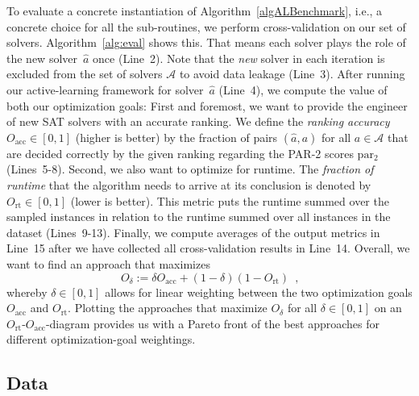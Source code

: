 \documentclass[runningheads]{llncs}
\begin{document}
To evaluate a concrete instantiation of Algorithm~\ref{algALBenchmark}, i.e., a concrete choice for all the sub-routines, we perform cross-validation on our set of solvers.
Algorithm~\ref{alg:eval} shows this.
That means each solver plays the role of the new solver~$\hat{a}$ once (Line~2).
Note that the \emph{new} solver in each iteration is excluded from the set of solvers $\mathcal{A}$ to avoid data leakage (Line~3).
After running our active-learning framework for solver~$\hat{a}$ (Line~4), we compute the value of both our optimization goals:
First and foremost, we want to provide the engineer of new SAT solvers with an accurate ranking.
We define the \emph{ranking accuracy} $O_{\operatorname{acc}} \in \left[0, 1\right]$ (higher is better) by the fraction of pairs $\left(\hat{a}, a\right)$ for all $a \in \mathcal{A}$ that are decided correctly by the given ranking regarding the PAR-2 scores $\operatorname{par_2}$ (Lines~5-8).
Second, we also want to optimize for runtime.
The \emph{fraction of runtime} that the algorithm needs to arrive at its conclusion is denoted by $O_{\operatorname{rt}} \in \left[0, 1\right]$ (lower is better).
This metric puts the runtime summed over the sampled instances in relation to the runtime summed over all instances in the dataset (Lines~9-13).
Finally, we compute averages of the output metrics in Line~15 after we have collected all cross-validation results in Line~14.
Overall, we want to find an approach that maximizes
%
\begin{equation}
  O_\delta := \delta O_{\operatorname{acc}} + \left(1 - \delta\right) \left(1 - O_{\operatorname{rt}}\right) \enspace \textrm{,}
  \label{eq:opt}
\end{equation} 
%
whereby $\delta \in \left[0, 1\right]$ allows for linear weighting between the two optimization goals $O_{\operatorname{acc}}$ and $O_{\operatorname{rt}}$.
Plotting the approaches that maximize $O_\delta$ for all $\delta \in \left[0, 1\right]$ on an $O_{\operatorname{rt}}$-$O_{\operatorname{acc}}$-diagram provides us with a Pareto front of the best approaches for different optimization-goal weightings.

\subsection{Data}
\end{document}
